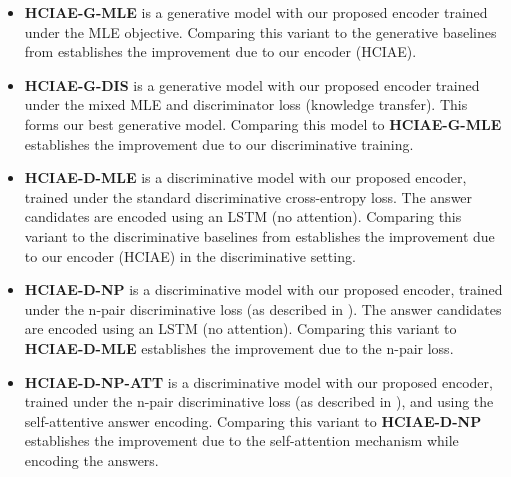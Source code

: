\documentclass{article}
\newcommand{\ourenc}{HCIAE\xspace}
\begin{document}
\begin{itemize}
\item \textbf{\ourenc-G-MLE} is a generative model with our proposed encoder trained under the MLE objective. Comparing 
this variant to the generative baselines from \cite{visdial} establishes the improvement due to our encoder (\ourenc). 

\item \textbf{\ourenc-G-DIS} is a generative model with our proposed encoder trained under the mixed MLE and discriminator loss
(knowledge transfer). This forms our best generative model. Comparing this model to \textbf{\ourenc-G-MLE} establishes the improvement 
due to our discriminative training. 

\item \textbf{\ourenc-D-MLE} is a discriminative model with our proposed encoder, trained under the standard discriminative 
cross-entropy loss. The answer candidates are encoded using an LSTM (no attention). Comparing this variant to the discriminative baselines from \cite{visdial} establishes the improvement due 
to our encoder (\ourenc) in the discriminative setting. 

\item \textbf{\ourenc-D-NP} is a discriminative model with our proposed encoder, trained under the n-pair discriminative loss 
(as described in ). The answer candidates are encoded using an LSTM (no attention). Comparing this variant to \textbf{\ourenc-D-MLE} establishes the improvement 
due to the n-pair loss. 

\item \textbf{\ourenc-D-NP-ATT} is a discriminative model with our proposed encoder, trained under the n-pair discriminative loss 
(as described in ), and using the self-attentive answer encoding. Comparing this variant to \textbf{\ourenc-D-NP} establishes the improvement 
due to the self-attention mechanism while encoding the answers.

\end{itemize}
\end{document}
